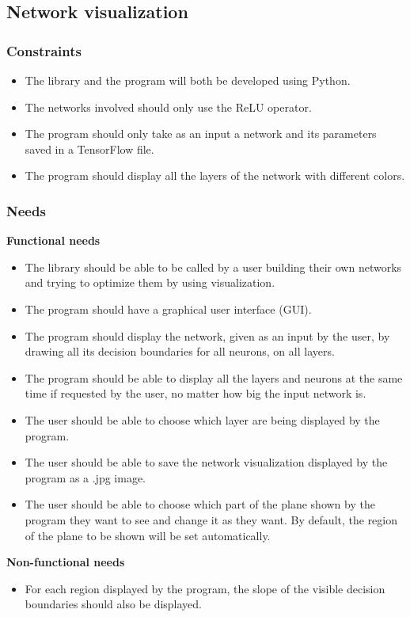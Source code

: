 \documentclass[a4paper]{article}
\begin{document}
\subsection{Network visualization}
\subsubsection{Constraints}
\begin{itemize}
\item The library and the program will both be developed using Python.
\item The networks involved should only use the ReLU operator. 
\item The program should only take as an input a network and its parameters saved in a TensorFlow file.
\item The program should display all the layers of the network with different colors.
\end{itemize}

\subsubsection{Needs}
\noindent\textbf{Functional needs}
\begin{itemize}
\item The library should be able to be called by a user building their own networks and trying to optimize them by using visualization.
\item The program should have a graphical user interface (GUI).
\item The program should display the network, given as an input by the user, by drawing all its decision boundaries for all neurons, on all layers. 
\item The program should be able to display all the layers and neurons at the same time if requested by the user, no matter how big the input network is.
\item The user should be able to choose which layer are being displayed by the program. 
\item The user should be able to save the network visualization displayed by the program as a .jpg image.
\item The user should be able to choose which part of the plane shown by the program they want to see and change it as they want. By default, the region of the plane to be shown will be set automatically. 

\end{itemize}
\noindent\textbf{Non-functional needs}
\begin{itemize}
\item For each region displayed by the program, the slope of the visible decision boundaries should also be displayed.
\end{itemize}
\end{document}
